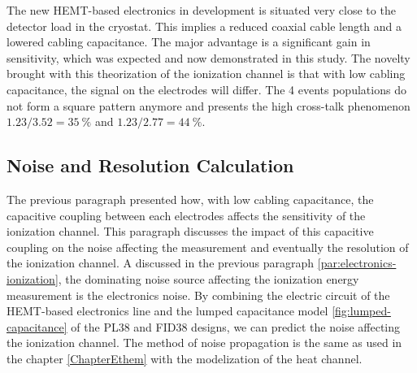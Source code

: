The new HEMT-based electronics in development is situated very close to the detector load in the cryostat. This implies a reduced coaxial cable length and a lowered cabling capacitance. The major advantage is a significant gain in sensitivity, which was expected and now demonstrated in this study. The novelty brought with this theorization of the ionization channel is that with low cabling capacitance, the signal on the electrodes will differ. The 4 events populations do not form a square pattern anymore and presents the high cross-talk phenomenon $1.23/3.52=\SI{35}{\percent}$ and $1.23/2.77=\SI{44}{\percent}$.


\subsection{Noise and Resolution Calculation}
\label{par:ion-resolution-calculation}

The previous paragraph presented how, with low cabling capacitance, the capacitive coupling between each electrodes affects the sensitivity of the ionization channel. This paragraph discusses the impact of this capacitive coupling on the noise affecting the measurement and eventually the resolution of the ionization channel. A discussed in the previous paragraph \ref{par:electronics-ionization}, the dominating noise source affecting the ionization energy measurement is the electronics noise. By combining the electric circuit of the HEMT-based electronics line and the lumped capacitance model \ref{fig:lumped-capacitance} of the PL38 and FID38 designs, we can predict the noise affecting the ionization channel. The method of noise propagation is the same as used in the chapter \ref{ChapterEthem} with the modelization of the heat channel.

%

